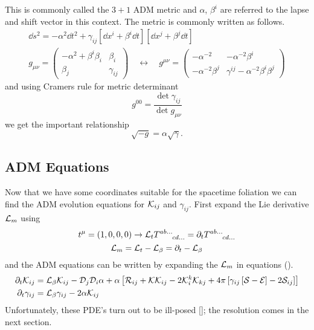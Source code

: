 This is commonly called the $3+1$ ADM metric and $\alpha$, $\beta^i$ are referred to the lapse and shift vector in this context. The metric is commonly written as follows.
\begin{gather}\dd s^2 = -\alpha^2 \dd t^2 + \gamma_{ij}\left[\dd x^i + \beta^i \dd t\right]\left[\dd x^j + \beta^j \dd t\right]\\
 g_{\mu\nu} = \begin{pmatrix} -\alpha^2 + \beta^i \beta_i & \beta_i \\ \beta_j & \gamma_{ij} \end{pmatrix}\quad \leftrightarrow\quad g^{\mu\nu} = \begin{pmatrix} -\alpha^{-2}  & -\alpha^{-2} \beta^i \\ -\alpha^{-2}\beta^j & \gamma^{ij} - \alpha^{-2}\beta^i \beta^j \end{pmatrix}\end{gather}
and using Cramers rule for metric determinant
\begin{equation} g^{00} = \frac{\det{\gamma_{ij}}}{\det{g_{\mu\nu}}}\end{equation}
we get the important relationship
\begin{equation} \sqrt{-g} = \alpha \sqrt{\gamma} .\end{equation}

\subsection{ADM Equations}
Now that we have some coordinates suitable for the spacetime foliation we can find the ADM evolution equations for $\mathcal{K}_{ij}$ and $\gamma_{ij}$. First expand the Lie derivative $\mathcal{L}_m$ using
\begin{equation} t^{\mu} = (1,0,0,0) \rightarrow \mathcal{L}_t {{T}}^{ab ...}_{\;\;\;\;\;\;\;cd ...} = \partial_t {{T}}^{ab ...}_{\;\;\;\;\;\;\;cd ...}\end{equation}
\begin{equation} \mathcal{L}_m = \mathcal{L}_{t} - \mathcal{L}_\beta  = \partial_t - \mathcal{L}_\beta\end{equation}
and the ADM equations can be written by expanding the $\mathcal{L}_m$ in equations (). 
\begin{align} \partial_t \mathcal{K}_{ij} &= \mathcal{L}_\beta \mathcal{K}_{ij}  -\mathcal{D}_j\mathcal{D}_i \alpha + \alpha \left[ \mathcal{R}_{ij} + \mathcal{K}\mathcal{K}_{ij} - 2\mathcal{K}^k_i\mathcal{K}_{kj} + 4\pi \left[ \gamma_{ij}\left[ \mathcal{S}-\mathcal{E}\right]-2\mathcal{S}_{ij}\right]\right]\\
\partial_t \gamma_{ij} &= \mathcal{L}_\beta \gamma_{ij} - 2\alpha\mathcal{K}_{ij}\end{align}
Unfortunately, these PDE's turn out to be ill-posed []; the resolution comes in the next section.


